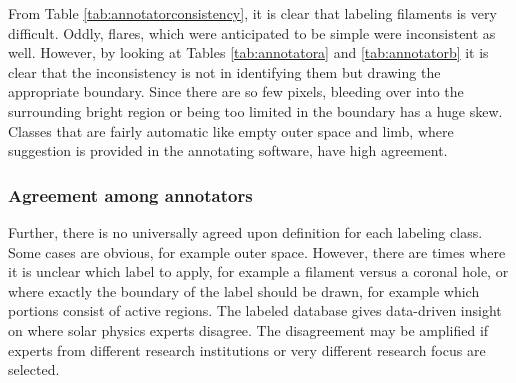 \documentclass[twoside]{report}
\begin{document}
From Table \ref{tab:annotatorconsistency}, it is clear that labeling filaments is very difficult. Oddly, flares, which were anticipated to be simple were inconsistent as well. However, by looking at Tables \ref{tab:annotatora} and \ref{tab:annotatorb} it is clear that the inconsistency is not in  identifying them but drawing the appropriate boundary. Since there are so few pixels, bleeding over into the surrounding bright region or being too limited in the boundary has a huge skew. Classes that are fairly automatic like empty outer space and limb, where suggestion is provided in the annotating software, have high agreement. 

\subsubsection{Agreement among annotators} \label{sec:agreement}
Further, there is no universally agreed upon definition for each labeling class. Some cases are obvious, for example outer space. However, there are times where it is unclear which label to apply, for example a filament versus a coronal hole, or where exactly the boundary of the label should be drawn, for example which portions consist of active regions. The labeled database gives data-driven insight on where solar physics experts disagree. The disagreement may be amplified if experts from different research institutions or very different research focus are selected. 
\end{document}
